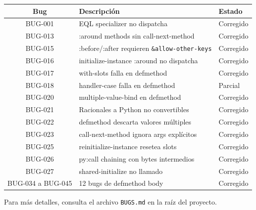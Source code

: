 \begin{center}
\begin{tabular}{cll}
\toprule
Bug & Descripción & Estado \\
\midrule
BUG-001 & EQL specializer no dispatcha & Corregido \\
BUG-013 & :around methods sin call-next-method & Corregido \\
BUG-015 & :before/:after requieren \allowbreak \texttt{\&allow-other-keys} & Corregido \\
BUG-016 & initialize-instance :around no dispatcha & Corregido \\
BUG-017 & with-slots falla en defmethod & Corregido \\
BUG-018 & handler-case falla en defmethod & Parcial \\
BUG-020 & multiple-value-bind en defmethod & Corregido \\
BUG-021 & Racionales a Python no convertibles & Corregido \\
BUG-022 & defmethod descarta valores múltiples & Corregido \\
BUG-023 & call-next-method ignora args explícitos & Corregido \\
BUG-025 & reinitialize-instance resetea slots & Corregido \\
BUG-026 & py:call chaining con bytes intermedios & Corregido \\
BUG-027 & shared-initialize no llamado & Corregido \\
BUG-034 a BUG-045 & 12 bugs de defmethod body & Corregido \\
\bottomrule
\end{tabular}
\end{center}

Para más detalles, consulta el archivo \texttt{BUGS.md} en la raíz del
proyecto.

\endinput

